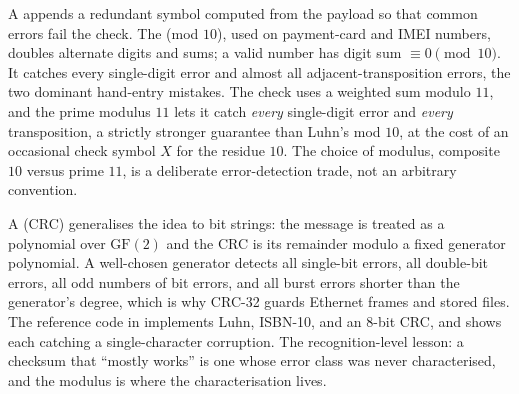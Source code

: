 A  appends a redundant symbol computed from the
payload so that common errors fail the check. The  (mod $10$), used on payment-card and IMEI numbers,
doubles alternate digits and sums; a valid number has digit sum
$\equiv 0 \pmod{10}$. It catches every single-digit error and
almost all adjacent-transposition errors, the two dominant
hand-entry mistakes. The  check uses a weighted sum
modulo $11$, and the prime modulus $11$ lets it catch \emph{every}
single-digit error and \emph{every} transposition, a strictly
stronger guarantee than Luhn's mod $10$, at the cost of an
occasional check symbol $X$ for the residue $10$. The choice of
modulus, composite $10$ versus prime $11$, is a deliberate
error-detection trade, not an arbitrary convention.

A  (CRC) generalises the idea to
bit strings: the message is treated as a polynomial over $\mathrm{GF}(2)$
and the CRC is its remainder modulo a fixed generator polynomial. A
well-chosen generator detects all single-bit errors, all
double-bit errors, all odd numbers of bit errors, and all burst
errors shorter than the generator's degree, which is why CRC-32
guards Ethernet frames and stored files. The reference code in
implements Luhn, ISBN-10, and an $8$-bit CRC, and shows each
catching a single-character corruption. The recognition-level
lesson: a checksum that ``mostly works'' is one whose error class
was never characterised, and the modulus is where the
characterisation lives.

